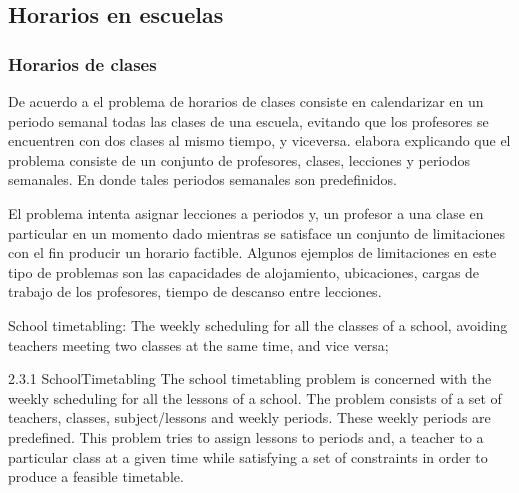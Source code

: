 \documentclass[draft,12pt,headsepline,footsepline,paper=letter]{scrreprt}
\begin{document}

\subsection{Horarios en escuelas}


\subsubsection{Horarios de clases}

De acuerdo a \citet[p.~88]{schaerf99a-survey-of-automated} el problema de horarios de clases consiste en calendarizar en un periodo semanal todas las clases de una escuela, evitando que los profesores se encuentren con dos clases al mismo tiempo, y viceversa. \citet[p.~10,11]{abdullah06heuristic-approaches} elabora explicando que el problema consiste de un conjunto de profesores, clases, lecciones y periodos semanales. En donde tales periodos semanales son predefinidos.

El problema intenta asignar lecciones a periodos y, un profesor a una clase en particular en un momento dado mientras se satisface un conjunto de limitaciones con el fin producir un horario factible. Algunos ejemplos de limitaciones en este tipo de problemas son las capacidades de alojamiento, ubicaciones, cargas de trabajo de los profesores, tiempo de descanso entre lecciones.

\iffalse
School timetabling: The weekly scheduling for all the classes of a school, avoiding teachers meeting two classes at the same time, and vice versa;

2.3.1 SchoolTimetabling
The school timetabling problem is concerned with the weekly scheduling for all the lessons of a school. The problem consists of a set of teachers, classes, subject/lessons and weekly periods. These weekly periods are predefined. This problem tries to assign lessons to periods and, a teacher to a particular class at a given time while satisfying a set of constraints in order to produce a feasible timetable. 
\end{document}

